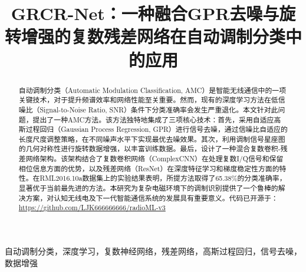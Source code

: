 \documentclass[conference]{IEEEtran}
\begin{document}
\sloppy

\title{GRCR-Net：一种融合GPR去噪与旋转增强的复数残差网络在自动调制分类中的应用}

\author{
}

\maketitle

\begin{abstract}
自动调制分类（Automatic Modulation Classification, AMC）是智能无线通信中的一项关键技术，对于提升频谱效率和网络性能至关重要。然而，现有的深度学习方法在低信噪比（Signal-to-Noise Ratio, SNR）条件下分类准确率会发生严重退化。本文针对此问题，提出了一种AMC方法。该方法独特地集成了三项核心技术：首先，采用自适应高斯过程回归（Gaussian Process Regression, GPR）进行信号去噪，通过信噪比自适应的长度尺度调整策略，在不同噪声水平下实现最优去噪效果。其次，利用调制信号星座图的几何对称性进行旋转数据增强，以丰富训练数据。最后，设计了一种混合复数卷积-残差网络架构。该架构结合了复数卷积网络（ComplexCNN）在处理复数I/Q信号和保留相位信息方面的优势，以及残差网络（ResNet）在深度特征学习和梯度稳定性方面的特性。在RML2016.10a数据集上的实验结果表明，所提方法取得了65.38\%的分类准确率，显著优于当前最先进的方法。本研究为复杂电磁环境下的调制识别提供了一个鲁棒的解决方案，对认知无线电及下一代智能通信系统的发展具有重要意义。代码已开源于：\url{https://github.com/LJK666666666/radioML-v3}
\end{abstract}

\begin{IEEEkeywords}
自动调制分类，深度学习，复数神经网络，残差网络，高斯过程回归，信号去噪，数据增强
\end{IEEEkeywords}


\end{document}

